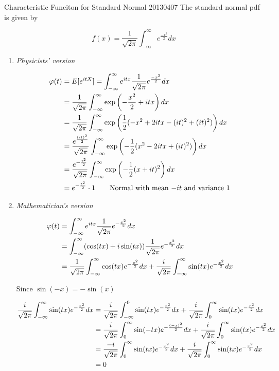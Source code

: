 \documentclass{article}
\begin{document}
\begin{section}{Characteristic Funciton for Standard Normal 20130407}
The standard normal pdf is given by

\[f(x) = \frac{1}{\sqrt{2\pi}} \int_{-\infty}^\infty e^{\frac{-x^2}{2}} dx \]

\begin{enumerate}
\item \emph{Physicists' version}

\begin{align}
\varphi(t) &= E[e^{itX}] = \int_{-\infty}^\infty e^{itx} \frac{1}{\sqrt{2\pi}}
   e^{\frac{-x^2}{2}} dx \notag\\
           &= \frac{1}{\sqrt{2\pi}} \int_{-\infty}^{\infty} 
               \exp\left(-\frac{x^2}{2} + itx\right) dx \notag\\
           &= \frac{1}{\sqrt{2\pi}} \int_{-\infty}^{\infty} 
               \exp\left(\frac{1}{2} (-x^2 + 2itx - (it)^2 + (it)^2)\right) 
               dx \notag\\
           &= \frac{e^{\frac{(it)^2}{2}}}{\sqrt{2\pi}} \int_{-\infty}^{\infty} 
               \exp\left(-\frac{1}{2} (x^2 - 2itx + (it)^2)\right) dx \notag\\
           &= \frac{e^{-\frac{t^2}{2}}}{\sqrt{2\pi}} \int_{-\infty}^{\infty} 
               \exp\left(-\frac{1}{2} (x + it)^2\right) dx \notag\\
           &= e^{-\frac{t^2}{2}} \cdot 1 
             \qquad\text{Normal with mean $-it$ and variance 1} \notag
\end{align}
\item \emph{Mathematician's version}

\begin{align}
\varphi(t) &= \int_{-\infty}^\infty e^{itx} \frac{1}{\sqrt{2\pi}}
              e^{-\frac{x^2}{2}} dx \notag\\
           &= \int_{-\infty}^\infty (\cos(tx) + i\sin(tx)) \frac{1}{\sqrt{2\pi}}
              e^{-\frac{x^2}{2}} dx \notag\\
           &= \frac{1}{\sqrt{2\pi}} \int_{-\infty}^\infty \cos(tx) 
               e^{-\frac{x^2}{2}} dx +
              \frac{i}{\sqrt{2\pi}} \int_{-\infty}^\infty \sin(tx) 
               e^{-\frac{x^2}{2}} dx \notag
\end{align}

Since $\sin(-x) = -\sin(x)$

\begin{align}
\frac{i}{\sqrt{2\pi}} \int_{-\infty}^\infty \sin(tx) e^{-\frac{x^2}{2}} dx 
    &= \frac{i}{\sqrt{2\pi}} \int_{-\infty}^0 \sin(tx) e^{-\frac{x^2}{2}} dx +
       \frac{i}{\sqrt{2\pi}} \int_{0}^\infty \sin(tx) e^{-\frac{x^2}{2}} dx 
       \notag\\
    &= \frac{i}{\sqrt{2\pi}} \int_0^\infty \sin(-tx) e^{-\frac{(-x)^2}{2}} dx +
       \frac{i}{\sqrt{2\pi}} \int_{0}^\infty \sin(tx) e^{-\frac{x^2}{2}} dx 
       \notag\\
    &= \frac{-i}{\sqrt{2\pi}} \int_0^\infty \sin(tx) e^{-\frac{x^2}{2}} dx +
       \frac{i}{\sqrt{2\pi}} \int_{0}^\infty \sin(tx) e^{-\frac{x^2}{2}} dx 
       \notag\\
    &= 0\notag
\end{align}


\end{enumerate}
\end{section}
\end{document}
